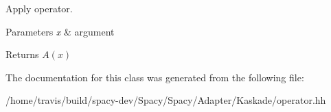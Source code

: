 Apply operator. 


\begin{DoxyParams}{Parameters}
{\em x} & argument \\
\hline
\end{DoxyParams}
\begin{DoxyReturn}{Returns}
$A(x)$ 
\end{DoxyReturn}


The documentation for this class was generated from the following file\-:\begin{DoxyCompactItemize}
\item 
/home/travis/build/spacy-\/dev/\-Spacy/\-Spacy/\-Adapter/\-Kaskade/operator.\-hh\end{DoxyCompactItemize}
